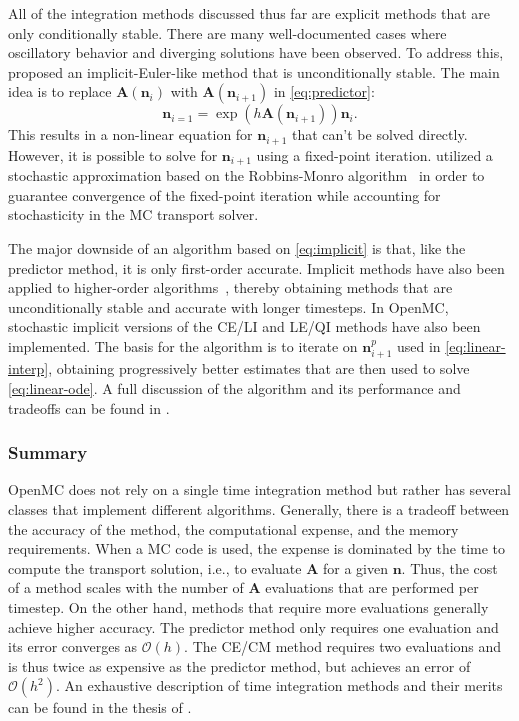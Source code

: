 \documentclass[3p,authoryear]{elsarticle}
\newcommand{\vect}[1]{\mathbf{#1}} %
\begin{document}
All of the integration methods discussed thus far are explicit methods that are
only conditionally stable. There are many well-documented cases where
oscillatory behavior and diverging solutions have been observed. To address
this, \citet{dufek2013ane} proposed an implicit-Euler-like method that is
unconditionally stable. The main idea is to replace $\vect{A}(\vect{n}_i)$ with
$\vect{A}(\vect{n}_{i+1})$ in \cref{eq:predictor}:
\begin{equation}
  \label{eq:implicit}
  \vect{n}_{i=1} = \exp \left( h\vect{A}(\vect{n}_{i+1}) \right) \vect{n}_i.
\end{equation}
This results in a non-linear equation for $\vect{n}_{i+1}$ that can't be solved
directly. However, it is possible to solve for $\vect{n}_{i+1}$ using a
fixed-point iteration. \citet{dufek2013ane} utilized a stochastic approximation
based on the Robbins-Monro algorithm~\citep{robbins1951ams} in order to
guarantee convergence of the fixed-point iteration while accounting for
stochasticity in the MC transport solver.

The major downside of an algorithm based on \cref{eq:implicit} is that, like the
predictor method, it is only first-order accurate. Implicit methods have also
been applied to higher-order
algorithms~\citep{kotlyar2014ane,kotlyar2016ane,cosgrove2020ane}, thereby
obtaining methods that are unconditionally stable and accurate with longer
timesteps. In OpenMC, stochastic implicit versions of the CE/LI and LE/QI
methods have also been implemented. The basis for the algorithm is to iterate on
$\vect{n}_{i+1}^p$ used in \cref{eq:linear-interp}, obtaining progressively
better estimates that are then used to solve \cref{eq:linear-ode}. A full
discussion of the algorithm and its performance and tradeoffs can be found in
\citep{josey2017phd}.

\subsubsection{Summary}

OpenMC does not rely on a single time integration method but rather has several
classes that implement different algorithms. Generally, there is a tradeoff
between the accuracy of the method, the computational expense, and the memory
requirements. When a MC code is used, the expense is dominated by the time
to compute the transport solution, i.e., to evaluate $\vect{A}$ for a given
$\vect{n}$. Thus, the cost of a method scales with the number of $\vect{A}$
evaluations that are performed per timestep. On the other hand, methods that
require more evaluations generally achieve higher accuracy. The predictor method
only requires one evaluation and its error converges as $\mathcal{O}(h)$. The
CE/CM method requires two evaluations and is thus twice as expensive as the
predictor method, but achieves an error of $\mathcal{O}(h^2)$. An exhaustive
description of time integration methods and their merits can be found in the
thesis of \citet{josey2017phd}.
\end{document}
